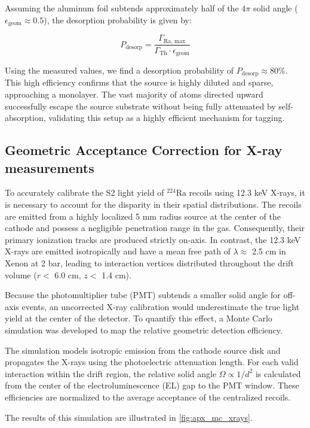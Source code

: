 Assuming the aluminum foil subtends approximately half of the $4\pi$ solid angle
($\epsilon_{\text{geom}} \approx 0.5$), the desorption probability is given by:

$$P_{\text{desorp}} = \frac{\Gamma_{\text{Ra, max}}}{\Gamma_{\text{Th}} \cdot \epsilon_{\text{geom}}}$$

Using the measured values, we find a desorption probability of $P_{\text{desorp}} \approx 80\%$.
This high efficiency confirms that the  source is highly diluted and sparse,
approaching a monolayer. The vast majority of  atoms directed upward successfully
escape the source substrate without being fully attenuated by self-absorption, validating this
setup as a highly efficient mechanism for  tagging.

\subsection{Geometric Acceptance Correction for X-ray measurements}

To accurately calibrate the S2 light yield of $^{224}\text{Ra}$ recoils using 12.3 keV X-rays, it
is necessary to account for the disparity in their spatial distributions. The recoils are emitted
from a highly localized 5 mm radius source at the center of the cathode and possess a negligible
penetration range in the gas. Consequently, their primary ionization tracks are produced strictly
on-axis. In contrast, the 12.3 keV X-rays are emitted isotropically and have a mean free path of
$\lambda \approx$ 2.5 cm in Xenon at 2 bar, leading to interaction vertices distributed throughout
the drift volume ($r <$ 6.0 cm, $z <$ 1.4 cm).

Because the photomultiplier tube (PMT) subtends a smaller solid angle for off-axis events, an
uncorrected X-ray calibration would underestimate the true light yield at the center of the
detector. To quantify this effect, a Monte Carlo simulation was developed to map the relative
geometric detection efficiency.

The simulation models isotropic emission from the cathode source disk and propagates the X-rays
using the photoelectric attenuation length. For each valid interaction within the drift region, the
relative solid angle $\Omega \propto 1/d^2$ is calculated from the center of the
electroluminescence (EL) gap to the PMT window. These efficiencies are normalized to the average
acceptance of the centralized recoils.

The results of this simulation are illustrated in \ref{fig:apx_mc_xrays}.

